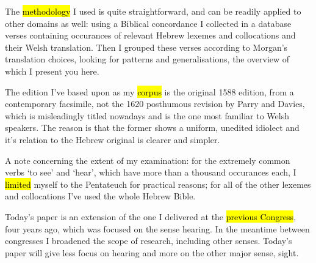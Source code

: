 \begin{paper}
	{\click} The \hl{methodology} I used is quite straightforward, and can be readily applied to other domains as well:  using a Biblical concordance I collected in a database verses containing occurances of relevant Hebrew lexemes and collocations and their Welsh translation.  Then I grouped these verses according to Morgan’s translation choices,  looking for patterns and generalisations, the overview of which I present you here.

	\begin{leftbar}
		{\click} The edition I’ve based upon as my \hl{corpus} is the original 1588 edition, from a contemporary facsimile, not the 1620 posthumous revision by Parry and Davies, which is misleadingly titled  nowadays and is the one most familiar to Welsh speakers. The reason is that the former shows a uniform, unedited idiolect and it’s relation to the Hebrew original is clearer and simpler.
	\end{leftbar}

	\begin{leftbar}
		{\click} A note concerning the extent of my examination: for the extremely common verbs  ‘to see’ and  ‘hear’, which have more than a thousand occurances each, I \hl{limited} myself to the Pentateuch for practical reasons; for all of the other lexemes and collocations I’ve used the whole Hebrew Bible.
	\end{leftbar}

	{\click} Today’s paper is an extension of the one I delivered at the \hl{previous Congress}, four years ago, which was focused on the sense hearing. In the meantime between congresses I broadened the scope of research, including other senses. Today’s paper will give less focus on hearing and more on the other major sense, sight.
\end{paper}
